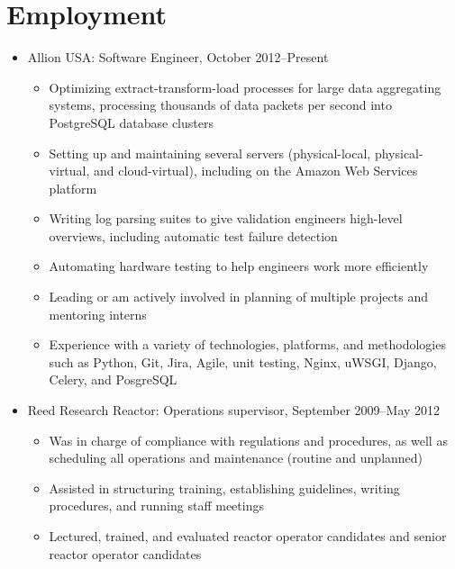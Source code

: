 \documentclass[letterpaper]{article}
\begin{document}
\section*{Employment}%

\begin{itemize}
\item Allion USA: Software Engineer, October 2012--Present
	\begin{itemize}
    \item Optimizing extract-transform-load processes for large data aggregating systems, processing thousands of data packets per second into PostgreSQL database clusters
    \item Setting up and maintaining several servers (physical-local, physical-virtual, and cloud-virtual), including on the Amazon Web Services platform%
    \item Writing log parsing suites to give validation engineers high-level overviews, including automatic test failure detection
    \item Automating hardware testing to help engineers work more efficiently 
    \item Leading or am actively involved in planning of multiple projects and mentoring interns
    \item Experience with a variety of technologies, platforms, and methodologies such as Python, Git, Jira, Agile, unit testing, Nginx, uWSGI, Django, Celery, and PosgreSQL 
	\end{itemize}
\item Reed Research Reactor: Operations supervisor, September 2009--May 2012
	\begin{itemize}
	\item Was in charge of compliance with regulations and procedures, as well as scheduling all operations and maintenance (routine and unplanned)
	\item Assisted in structuring training, establishing guidelines, writing procedures, and running staff meetings
	\item Lectured, trained, and evaluated reactor operator candidates and senior reactor operator candidates

\end{itemize}
\end{itemize}
\end{document}
